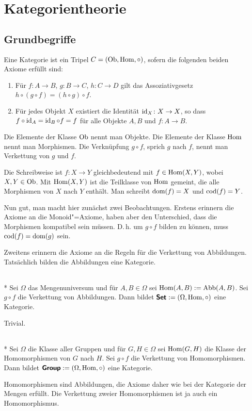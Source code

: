 
\chapter{Kategorientheorie}

\section{Grundbegriffe}

\begin{Definition}[Kategorie]
Eine Kategorie ist ein Tripel $C = (\operatorname{Ob},\operatorname{Hom},{\circ})$,
sofern die folgenden beiden Axiome erfüllt sind:
\begin{enumerate}
\item Für $f\colon A\to B$, $g\colon B\to C$, $h\colon C\to D$ gilt
das Assoziativgesetz $h\circ (g\circ f) = (h\circ g)\circ f$.
\item Für jedes Objekt $X$ existiert die Identität $\operatorname{id}_X\colon X\to X$,
so dass $f\circ\operatorname{id}_A = \operatorname{id}_B\circ f=f$ für alle Objekte $A,B$
und $f\colon A\to B$.
\end{enumerate}
\end{Definition}
Die Elemente der Klasse $\operatorname{Ob}$ nennt man Objekte. Die
Elemente der Klasse $\operatorname{Hom}$ nennt man Morphismen. Die
Verknüpfung $g\circ f$, sprich $g$ nach $f$, nennt man Verkettung
von $g$ und $f$.

Die Schreibweise ist $f\colon X\to Y$ gleichbedeutend mit
$f\in\operatorname{Hom}(X,Y)$, wobei $X,Y\in\operatorname{Ob}$.
Mit $\operatorname{Hom}(X,Y)$ ist die Teilklasse von
$\operatorname{Hom}$ gemeint, die alle Morphismen von $X$ nach $Y$
enthält. Man schreibt $\operatorname{dom}(f) = X$ und $\operatorname{cod}(f) = Y$.

Nun gut, man macht hier zunächst zwei Beobachtungen. Erstens
erinnern die Axiome an die Monoid"=Axiome, haben aber den Unterschied,
dass die Morphismen kompatibel sein müssen. D.\,h. um $g\circ f$
bilden zu können, muss $\operatorname{cod}(f)=\operatorname{dom}(g)$ sein.

Zweitens erinnern die Axiome an die Regeln für die Verkettung
von Abbildungen. Tatsächlich bilden die Abbildungen eine Kategorie.

\begin{Satz}\mbox{}\\*
Sei $\Omega$ das Mengenuniversum und für $A,B\in\Omega$ sei
$\operatorname{Hom}(A,B):=\operatorname{Abb}(A,B)$. Sei $g\circ f$ die Verkettung
von Abbildungen. Dann bildet $\textsf{\textbf{Set}}:=(\Omega,\operatorname{Hom},\circ)$
eine Kategorie.
\end{Satz}
 Trivial.\;\qedsymbol

\begin{Satz}\mbox{}\\*
Sei $\Omega$ die Klasse aller Gruppen und für $G,H\in\Omega$ sei
$\operatorname{Hom}(G,H)$ die Klasse der Homomorphismen von $G$ nach $H$.
Sei $g\circ f$ die Verkettung von Homomorphismen.
Dann bildet $\textsf{\textbf{Group}}:=(\Omega,\operatorname{Hom},\circ)$
eine Kategorie.
\end{Satz}
 Homomorphismen sind Abbildungen, die Axiome
daher wie bei der Kategorie der Mengen erfüllt. Die Verkettung
zweier Homomorphismen ist ja auch ein Homomorphismus.\;\qedsymbol

